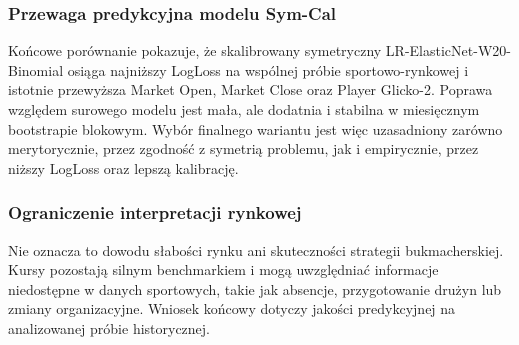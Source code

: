 \subsubsection{Przewaga predykcyjna modelu Sym-Cal}

Końcowe porównanie pokazuje, że skalibrowany symetryczny LR-ElasticNet-W20-Binomial osiąga najniższy LogLoss na wspólnej próbie sportowo-rynkowej i istotnie przewyższa Market Open, Market Close oraz Player Glicko-2. Poprawa względem surowego modelu jest mała, ale dodatnia i stabilna w miesięcznym bootstrapie blokowym. Wybór finalnego wariantu jest więc uzasadniony zarówno merytorycznie, przez zgodność z symetrią problemu, jak i empirycznie, przez niższy LogLoss oraz lepszą kalibrację.

\subsubsection{Ograniczenie interpretacji rynkowej}

Nie oznacza to dowodu słabości rynku ani skuteczności strategii bukmacherskiej. Kursy pozostają silnym benchmarkiem i mogą uwzględniać informacje niedostępne w danych sportowych, takie jak absencje, przygotowanie drużyn lub zmiany organizacyjne. Wniosek końcowy dotyczy jakości predykcyjnej na analizowanej próbie historycznej.
